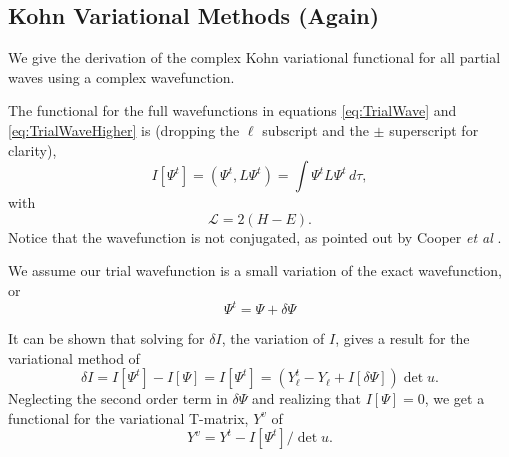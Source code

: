 \documentclass[preprint,showpacs,preprintnumbers,amsmath,amssymb]{revtex4}
\newcommand{\beq}{\begin{equation}}
\newcommand{\eeq}{\end{equation}}
\begin{document}
\subsection{Kohn Variational Methods (Again)}
\label{sec:GenKohn}



We give the derivation of the complex Kohn variational functional for all partial waves using a complex wavefunction.

The functional for the full wavefunctions in equations \ref{eq:TrialWave} and \ref{eq:TrialWaveHigher} is (dropping the $\ell$ subscript and the $\pm$ superscript for clarity),
\begin{equation}
I[\Psi^t] = \left(\Psi^t, L \Psi^t \right) = \int \Psi^t L \Psi^t \,d\tau,
\label{eq:IlDefPsi}
\end{equation}
with
\beq
\mathcal{L} = 2(H - E).
\label{eq:LDef}
\eeq
Notice that the wavefunction is not conjugated, as pointed out by Cooper \emph{et al} \cite{Cooper2010}.

We assume our trial wavefunction is a small variation of the exact wavefunction, or
\beq
\Psi^t = \Psi + \delta \Psi
\label{eq:PsiTrialRelation}
\eeq

It can be shown that solving for $\delta I$, the variation of $I$, gives a result for the variational method of
\beq
\delta I = I[\Psi^t] - I[\Psi] = I[\Psi^t] = (Y_\ell^t - Y_\ell + I[\delta \Psi]) \det u.
\label{eq:IlPsiVariation}
\eeq
Neglecting the second order term in $\delta \Psi$ and realizing that $I[\Psi] = 0$, we get a functional for the variational T-matrix, $Y^v$ of
\beq
Y^v = Y^t - I[\Psi^t] / \det u.
\label{eq:ComplexKohnVariation}
\eeq
\end{document}
